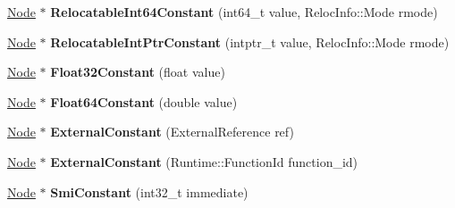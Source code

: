 \begin{DoxyCompactItemize}
\item 
\hyperlink{classv8_1_1internal_1_1compiler_1_1_node}{Node} $\ast$ {\bfseries Relocatable\+Int64\+Constant} (int64\+\_\+t value, Reloc\+Info\+::\+Mode rmode)\hypertarget{classv8_1_1internal_1_1compiler_1_1_j_s_graph_a5fa307dcce632ee01c50d7e7f1a0e088}{}\label{classv8_1_1internal_1_1compiler_1_1_j_s_graph_a5fa307dcce632ee01c50d7e7f1a0e088}

\item 
\hyperlink{classv8_1_1internal_1_1compiler_1_1_node}{Node} $\ast$ {\bfseries Relocatable\+Int\+Ptr\+Constant} (intptr\+\_\+t value, Reloc\+Info\+::\+Mode rmode)\hypertarget{classv8_1_1internal_1_1compiler_1_1_j_s_graph_a5a4c612525f8fd56b404ef9d0f906fae}{}\label{classv8_1_1internal_1_1compiler_1_1_j_s_graph_a5a4c612525f8fd56b404ef9d0f906fae}

\item 
\hyperlink{classv8_1_1internal_1_1compiler_1_1_node}{Node} $\ast$ {\bfseries Float32\+Constant} (float value)\hypertarget{classv8_1_1internal_1_1compiler_1_1_j_s_graph_a0f28eaac5d5a7cf29ccb91b65bf8425c}{}\label{classv8_1_1internal_1_1compiler_1_1_j_s_graph_a0f28eaac5d5a7cf29ccb91b65bf8425c}

\item 
\hyperlink{classv8_1_1internal_1_1compiler_1_1_node}{Node} $\ast$ {\bfseries Float64\+Constant} (double value)\hypertarget{classv8_1_1internal_1_1compiler_1_1_j_s_graph_a73dc947f0df4edd465b2b332defee2ec}{}\label{classv8_1_1internal_1_1compiler_1_1_j_s_graph_a73dc947f0df4edd465b2b332defee2ec}

\item 
\hyperlink{classv8_1_1internal_1_1compiler_1_1_node}{Node} $\ast$ {\bfseries External\+Constant} (External\+Reference ref)\hypertarget{classv8_1_1internal_1_1compiler_1_1_j_s_graph_a331ec8fa7d7aa37d1f617490a4432551}{}\label{classv8_1_1internal_1_1compiler_1_1_j_s_graph_a331ec8fa7d7aa37d1f617490a4432551}

\item 
\hyperlink{classv8_1_1internal_1_1compiler_1_1_node}{Node} $\ast$ {\bfseries External\+Constant} (Runtime\+::\+Function\+Id function\+\_\+id)\hypertarget{classv8_1_1internal_1_1compiler_1_1_j_s_graph_a0dab265b5a21c418a29f25d65c8ce295}{}\label{classv8_1_1internal_1_1compiler_1_1_j_s_graph_a0dab265b5a21c418a29f25d65c8ce295}

\item 
\hyperlink{classv8_1_1internal_1_1compiler_1_1_node}{Node} $\ast$ {\bfseries Smi\+Constant} (int32\+\_\+t immediate)\hypertarget{classv8_1_1internal_1_1compiler_1_1_j_s_graph_a122deaff5ad49bf7c475fb6a65f0ccf2}{}\label{classv8_1_1internal_1_1compiler_1_1_j_s_graph_a122deaff5ad49bf7c475fb6a65f0ccf2}


\end{DoxyCompactItemize}
